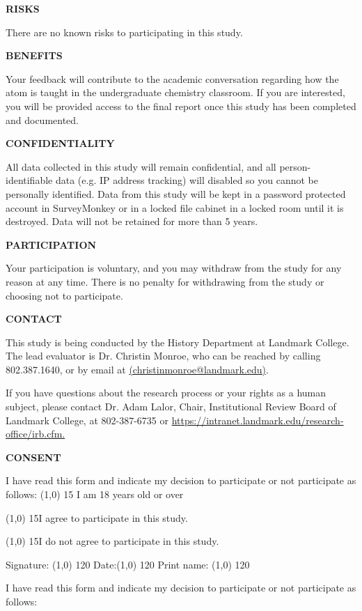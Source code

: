 \documentclass[11pt]{sig-alternate}
\begin{document}
\begin{large}
\textbf{RISKS}

There are no known risks to participating in this study.

\textbf{BENEFITS}

Your feedback will contribute to the academic conversation regarding how the atom is taught in the undergraduate chemistry classroom.  If you are interested, you will be provided access to the final report once this study has been completed and documented. 

\textbf{CONFIDENTIALITY}

All data collected in this study will remain confidential, and all person-identifiable data (e.g. IP address tracking) will disabled so you cannot be personally identified. Data from this study will be kept in a password protected account in SurveyMonkey or in a locked file cabinet in a locked room until it is destroyed. Data will not be retained for more than 5 years.

\textbf{PARTICIPATION}

Your participation is voluntary, and you may withdraw from the study for any reason at any time. There is no penalty for withdrawing from the study or choosing not to participate. 

\textbf{CONTACT}

This study is being conducted by the History Department at Landmark College. The lead evaluator is Dr. Christin Monroe, who can be reached by calling 802.387.1640, or by email at \href{mailto:csupalo@ets.org}{(christinmonroe@landmark.edu)}. 

If you have questions about the research process or your rights as a human subject, please contact Dr. Adam Lalor, Chair, Institutional Review Board of Landmark College, at 802-387-6735 or \href{https://intranet.landmark.edu/research-office/irb.cfm.}{https://intranet.landmark.edu/research-office/irb.cfm.}

\textbf{CONSENT}

I have read this form and indicate my decision to participate or not participate as follows: 
\line(1,0) {15} I am 18 years old or over

\line(1,0) {15}I agree to participate in this study.

\line(1,0) {15}I do not agree to participate in this study.

Signature: \line(1,0) {120}	
Date:\line(1,0) {120}
Print name: \line(1,0) {120}	


I have read this form and indicate my decision to participate or not participate as follows: 


\end{large}
\end{document}
